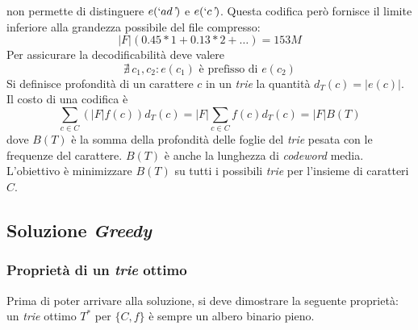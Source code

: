 non permette di distinguere $e(`ad \textit{'})$ e $e(`c \textit{'})$.
Questa codifica però fornisce il limite inferiore alla grandezza possibile del file compresso:
\begin{equation*}
    |F| \left( 0.45*1 + 0.13*2 + \dots \right) = 153M
\end{equation*}
Per assicurare la decodificabilità deve valere
\begin{equation*}
    \nexists \, c_1, c_2 : e(c_1) \text{ è prefisso di } e(c_2)
\end{equation*}
Si definisce profondità di un carattere $c$ in un \emph{trie} la quantità $d_T(c) = |e(c)|$.
\\
Il costo di una codifica è
\begin{equation*}
    \sum_{c \in C}\left( |F| f(c) \right) d_T(c) = 
    |F| \sum_{c \in C} f(c) d_T(c) = 
    |F| B(T)
\end{equation*}
dove $B(T)$ è la somma della profondità delle foglie del \emph{trie} pesata con le frequenze del carattere. $B(T)$ è anche la lunghezza di \emph{codeword} media.
\\
L'obiettivo è minimizzare $B(T)$ su tutti i possibili \emph{trie} per l'insieme di caratteri $C$.

\subsection{Soluzione \emph{Greedy}}

\subsubsection{Proprietà di un \emph{trie} ottimo}

Prima di poter arrivare alla soluzione, si deve dimostrare la seguente proprietà: un \emph{trie} ottimo $T^*$ per $\{C,f\}$ è sempre un albero binario pieno.

